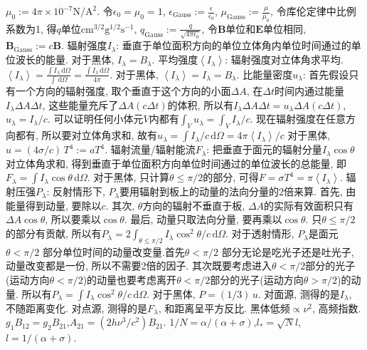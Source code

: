 \documentclass[12pt]{ctexart}
\title{}
\author{}
\def\b{\boldsymbol}
\theoremstyle{definition}
\begin{document}
\small
\pagestyle{empty}
$\mu_0:=4\pi\times10^{-7}\text{N}/\text{A}^2$. 令$\epsilon_0=\mu_0=1$,
$\epsilon_\text{Gauss}:=\frac{\epsilon}{\epsilon_0}$,
$\mu_\text{Gauss}:=\frac{\mu}{\mu_0}$,
令库伦定律中比例系数为1, 得$q$单位$\text{cm}^{3/2}\text{g}^{1/2}\text{s}^{-1}$,
$q_\text{Gauss}:=\frac{q}{\sqrt{4\pi\epsilon_0}}$,
令$\b{B}$单位和$\b{E}$单位相同,
$\b{B}_\text{Gauss}:=c\b{B}$.
辐射强度$I_\lambda$: 垂直于单位面积方向的单位立体角内单位时间通过的单位波长的能量. 对于黑体, $I_\lambda=B_\lambda$.
平均强度$\left\langle I_\lambda\right\rangle $: 辐射强度对立体角求平均.$\left\langle I_\lambda\right\rangle = \frac{\int I_\lambda \,\mathrm{d}\Omega}{\int \,\mathrm{d}\Omega}=\frac{\int I_\lambda \,\mathrm{d}\Omega}{4\pi}$.
对于黑体, $\left\langle I_\lambda\right\rangle=I_\lambda=B_\lambda$.
比能量密度$u_\lambda$: 首先假设只有一个方向的辐射强度, 取个垂直于这个方向的小面$\Delta A$, 在$\Delta t$时间内通过能量$I_\lambda \Delta A \Delta t$, 这些能量充斥了$\Delta A (c \Delta t)$的体积, 所以有$I_\lambda \Delta A \Delta t = u_\lambda \Delta A (c \Delta t)$, $u_\lambda = I_\lambda/c$. 可以证明任何小体元$V$内都有$\int_V u_\lambda = \int_V I_\lambda/c$. 现在辐射强度在任意方向都有, 所以要对立体角求和, 故有$u_\lambda = \int I_\lambda/c\,\mathrm{d}\Omega = 4\pi\left\langle I_\lambda\right\rangle/c$
对于黑体, $u=(4\sigma/c)\,T^4:=aT^4$.
辐射流量/辐射能流$F_\lambda$: 把垂直于面元的辐射分量$I_\lambda\cos\theta$对立体角求和, 得到垂直于单位面积方向单位时间通过的单位波长的总能量, 即$F_\lambda = \int I_\lambda \cos\theta \,\mathrm{d}\Omega.$
对于黑体, 只计算$\theta\le\pi/2$的部分, 可得$F=\sigma T^4=\pi \left\langle I_\lambda\right\rangle$.
辐射压强$P_\lambda$: 反射情形下, $P_\lambda$要用辐射到板上的动量的法向分量的2倍来算. 首先, 由能量得到动量, 要除以$c$. 其次, $\theta$方向的辐射不垂直于板, $\Delta A$的实际有效面积只有$\Delta A \cos\theta$, 所以要乘以$\cos\theta$. 最后, 动量只取法向分量, 要再乘以$\cos\theta$. 只$\theta\le\pi/2$的部分有贡献, 所以有$P_\lambda = 2\int_{\theta\le\pi/2} I_\lambda\cos^2\theta/c \,\mathrm{d}\Omega$.
对于透射情形, $P_\lambda$是面元$\theta<\pi/2$ 部分单位时间的动量改变量.首先$\theta<\pi/2$ 部分无论是吃光子还是吐光子, 动量改变都是一份, 所以不需要2倍的因子. 其次既要考虑进入$\theta<\pi/2$部分的光子(运动方向$\theta<\pi/2$)的动量也要考虑离开$\theta<\pi/2$部分的光子(运动方向$\theta>\pi/2$)的动量. 所以有$P_\lambda = \int I_\lambda\cos^2\theta/c \,\mathrm{d}\Omega.$
对于黑体, $P=(1/3)\,u$.
对面源, 测得的是$I_\lambda$, 不随距离变化.
对点源, 测得的是$F_\lambda$, 和距离呈平方反比.
黑体低频$\propto \nu^2$, 高频指数.
$g_1B_{12}=g_2B_{21}$,$A_{21}=(2h\nu^3/c^2)B_{21}$.
$1/N=\alpha/(\alpha+\sigma)$,$l_*=\sqrt{N}l$,$l=1/(\alpha+\sigma)$.
\end{document}
